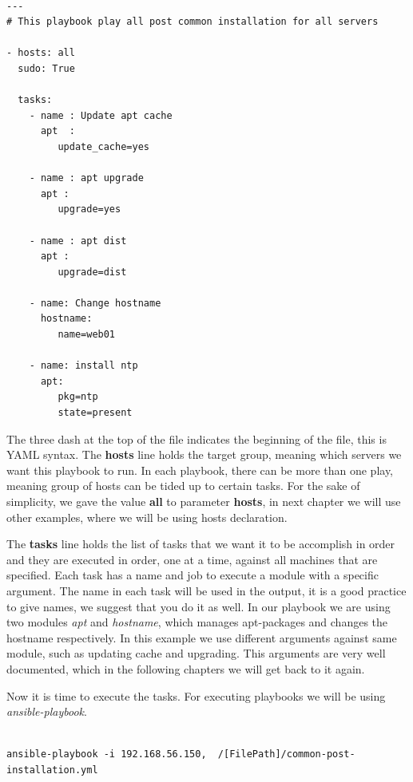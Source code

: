 \documentclass[10pt]{book}
\begin{document}
\begin{Verbatim} 
 
---
# This playbook play all post common installation for all servers

- hosts: all
  sudo: True

  tasks:
    - name : Update apt cache
      apt  : 
         update_cache=yes

    - name : apt upgrade
      apt : 
         upgrade=yes

    - name : apt dist
      apt : 
         upgrade=dist

    - name: Change hostname
      hostname: 
         name=web01

    - name: install ntp
      apt:  
         pkg=ntp
         state=present

\end{Verbatim}
 
The three dash at the top of the file indicates the beginning of the file, this is YAML syntax. 
The {\bf hosts} line holds the target group, meaning which servers we want this playbook to run.
In each playbook, there can be more than one play, meaning group of hosts can be tided up to certain 
tasks. For the sake of simplicity, we gave the value {\bf all} to parameter {\bf hosts}, 
in next chapter we will use other examples, where we will be using hosts declaration.

The {\bf tasks} line holds the list of tasks that we want it to be accomplish 
in order and they are executed in order, one at a time, 
against all machines that are specified. Each task has a 
name and job to execute a module with a specific argument. 
The name in each task will be used in the output, it is a good 
practice to give names, we suggest that you do it as well. In our playbook we 
are using two modules \emph{apt} and \emph{hostname}, which manages apt-packages 
and changes the hostname respectively. In this example we use different 
arguments against same module, such as updating cache and upgrading. This 
arguments are very well documented, which in the following chapters we will get 
back to it again. 

Now it is time to execute the tasks. For 
executing playbooks we will be using \emph{ansible-playbook}.

\begin{Verbatim} 

ansible-playbook -i 192.168.56.150,  /[FilePath]/common-post-installation.yml 
  
\end{Verbatim}
\end{document}

